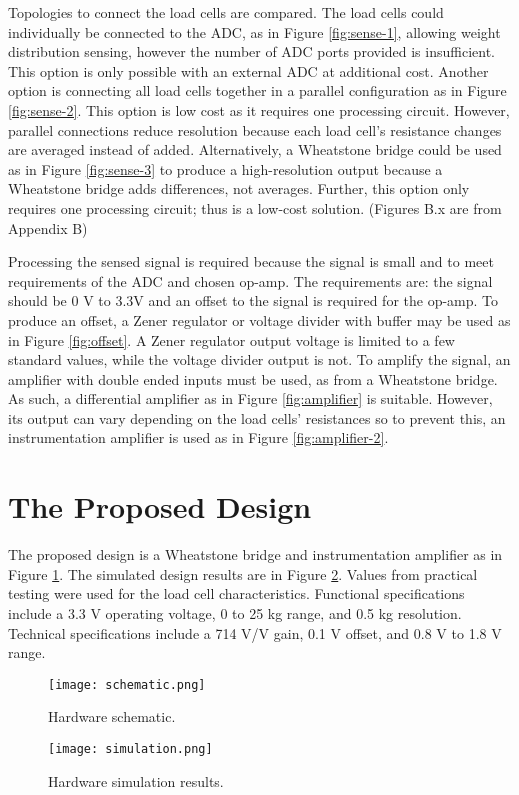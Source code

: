 Topologies to connect the load cells are compared. The load cells could individually be connected to the ADC, as in Figure \ref{fig:sense-1}, allowing weight distribution sensing, however the number of ADC ports provided is insufficient. This option is only possible with an external ADC at additional cost. Another option is connecting all load cells together in a parallel configuration as in Figure \ref{fig:sense-2}. This option is low cost as it requires one processing circuit. However, parallel connections reduce resolution because each load cell's resistance changes are averaged instead of added. Alternatively, a Wheatstone bridge could be used as in Figure \ref{fig:sense-3} to produce a high-resolution output because a Wheatstone bridge adds differences, not averages. Further, this option only requires one processing circuit; thus is a low-cost solution. (Figures B.x are from Appendix B)



Processing the sensed signal is required because the signal is small and to meet requirements of the ADC and chosen op-amp. The requirements are: the signal should be 0 V to 3.3V and an offset to the signal is required for the op-amp. To produce an offset, a Zener regulator or voltage divider with buffer may be used as in Figure \ref{fig:offset}. A Zener regulator output voltage is limited to a few standard values, while the voltage divider output is not. To amplify the signal, an amplifier with double ended inputs must be used, as from a Wheatstone bridge. As such, a differential amplifier as in Figure \ref{fig:amplifier} is suitable. However, its output can vary depending on the load cells' resistances so to prevent this, an instrumentation amplifier is used as in Figure \ref{fig:amplifier-2}.





\section{The Proposed Design}

The proposed design is a Wheatstone bridge and instrumentation amplifier as in Figure \ref{fig:schematic}. The simulated design results are in Figure \ref{fig:simulation}. Values from practical testing were used for the load cell characteristics. Functional specifications include a 3.3 V operating voltage, 0 to 25 kg range, and 0.5 kg resolution. Technical specifications include a 714 V/V gain, 0.1 V offset, and 0.8 V to 1.8 V range.



\begin{figure}[!ht]
	\centering
	\texttt{[image: schematic.png]}
	\caption{Hardware schematic.}
	\label{fig:schematic}
\end{figure}

\begin{figure}[!ht]
	\centering
	\texttt{[image: simulation.png]}
	\caption{Hardware simulation results.}
	\label{fig:simulation}
\end{figure}



